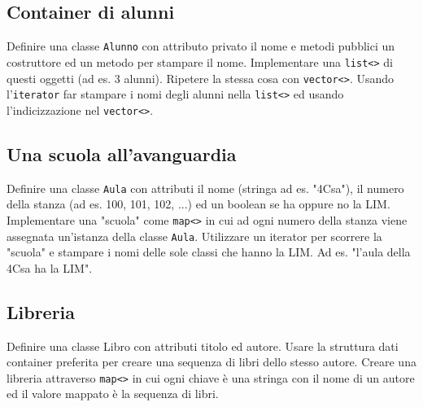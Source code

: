 \documentclass{article}
\begin{document}
\subsection{Container di alunni}
Definire una classe \texttt{Alunno} con attributo privato il nome e metodi pubblici un costruttore ed un metodo per stampare il nome. Implementare una \texttt{list<>} di questi oggetti (ad es. 3 alunni). Ripetere la stessa cosa con \texttt{vector<>}. Usando l'\texttt{iterator} far stampare i nomi degli alunni nella \texttt{list<>} ed usando l'indicizzazione nel \texttt{vector<>}.

\subsection{Una scuola all'avanguardia}
Definire una classe \texttt{Aula} con attributi il nome (stringa ad es. "4Csa"), il numero della stanza (ad es. 100, 101, 102, ...) ed un boolean se ha oppure no la LIM. Implementare una "scuola" come \texttt{map<>} in cui ad ogni numero della stanza viene assegnata un'istanza della classe \texttt{Aula}. Utilizzare un iterator per scorrere la "scuola" e stampare i nomi delle sole classi che hanno la LIM. Ad es. "l'aula della 4Csa ha la LIM".

\subsection{Libreria}
Definire una classe Libro con attributi titolo ed autore. Usare la struttura dati container preferita per creare una sequenza di libri dello stesso autore. Creare una libreria attraverso \texttt{map<>} in cui ogni chiave è una stringa con il nome di un autore ed il valore mappato è la sequenza di libri.
    	
\end{document}
